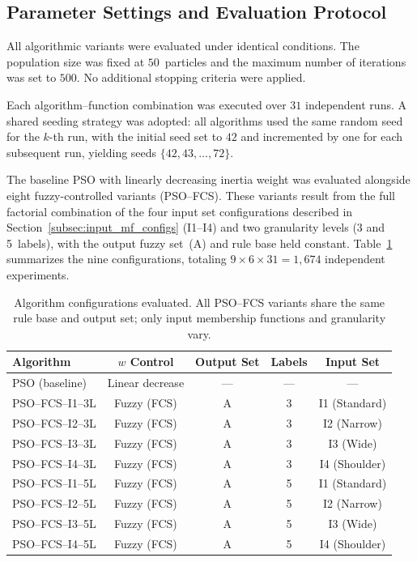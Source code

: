 \subsection{Parameter Settings and Evaluation Protocol}
\label{subsec:protocol}

All algorithmic variants were evaluated under identical conditions. The population size was fixed at $50$~particles and the maximum number of iterations was set to $500$. No additional stopping criteria were applied.

Each algorithm--function combination was executed over $31$ independent runs. A shared seeding strategy was adopted: all algorithms used the same random seed for the $k$-th run, with the initial seed set to $42$ and incremented by one for each subsequent run, yielding seeds $\{42, 43, \ldots, 72\}$.

The baseline PSO with linearly decreasing inertia weight was evaluated alongside eight fuzzy-controlled variants (PSO--FCS). These variants result from the full factorial combination of the four input set configurations described in Section~\ref{subsec:input_mf_configs} (I1--I4) and two granularity levels (3 and 5~labels), with the output fuzzy set~(A) and rule base held constant. Table~\ref{tab:algorithm_configs} summarizes the nine configurations, totaling $9 \times 6 \times 31 = 1{,}674$ independent experiments.

\begin{table}[!ht]
    \caption{Algorithm configurations evaluated. All PSO--FCS variants share the same rule base and output set; only input membership functions and granularity vary.}
    \label{tab:algorithm_configs}
    \centering
    \begin{tabular}{lcccc}
    \toprule
    Algorithm & $w$ Control & Output Set & Labels & Input Set \\
    \midrule
    PSO (baseline)   & Linear decrease & --- & --- & --- \\
    PSO--FCS--I1--3L & Fuzzy (FCS) & A & 3 & I1 (Standard) \\
    PSO--FCS--I2--3L & Fuzzy (FCS) & A & 3 & I2 (Narrow) \\
    PSO--FCS--I3--3L & Fuzzy (FCS) & A & 3 & I3 (Wide) \\
    PSO--FCS--I4--3L & Fuzzy (FCS) & A & 3 & I4 (Shoulder) \\
    PSO--FCS--I1--5L & Fuzzy (FCS) & A & 5 & I1 (Standard) \\
    PSO--FCS--I2--5L & Fuzzy (FCS) & A & 5 & I2 (Narrow) \\
    PSO--FCS--I3--5L & Fuzzy (FCS) & A & 5 & I3 (Wide) \\
    PSO--FCS--I4--5L & Fuzzy (FCS) & A & 5 & I4 (Shoulder) \\
    \bottomrule
    \end{tabular}
\end{table}

